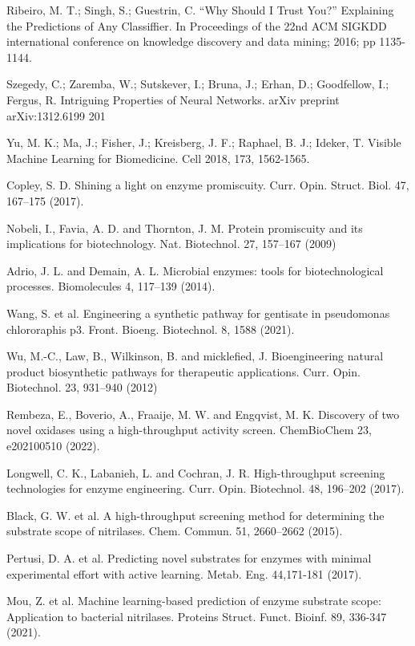 \documentclass[12pt]{article}
\begin{document}
\begin{thebibliography}{20}
 Ribeiro, M. T.; Singh, S.; Guestrin, C. “Why Should I Trust You?” Explaining the Predictions of Any Classiffier. In Proceedings of the 22nd ACM SIGKDD international conference on knowledge discovery and data mining; 2016; pp 1135-1144.

 Szegedy, C.; Zaremba, W.; Sutskever, I.; Bruna, J.; Erhan, D.; Goodfellow, I.; Fergus, R. Intriguing Properties of Neural Networks. arXiv preprint arXiv:1312.6199 201

 Yu, M. K.; Ma, J.; Fisher, J.; Kreisberg, J. F.; Raphael, B. J.; Ideker, T. Visible Machine Learning for Biomedicine. Cell 2018, 173, 1562-1565.


 Copley, S. D. Shining a light on enzyme promiscuity. Curr. Opin. Struct. Biol. 47, 167–175 (2017).

 Nobeli, I., Favia, A. D. and Thornton, J. M. Protein promiscuity and its implications for biotechnology. Nat. Biotechnol. 27, 157–167 (2009)

 Adrio, J. L. and Demain, A. L. Microbial enzymes: tools for biotechnological processes. Biomolecules 4, 117–139 (2014).

 Wang, S. et al. Engineering a synthetic pathway for gentisate in pseudomonas chlororaphis p3. Front. Bioeng. Biotechnol. 8, 1588 (2021).

 Wu, M.-C., Law, B., Wilkinson, B. and micklefied, J. Bioengineering natural product biosynthetic pathways for therapeutic applications. Curr. Opin. Biotechnol. 23, 931–940 (2012)


 Rembeza, E., Boverio, A., Fraaije, M. W. and Engqvist, M. K. Discovery of two novel oxidases using a high-throughput activity screen. ChemBioChem 23, e202100510 (2022).

 Longwell, C. K., Labanieh, L. and Cochran, J. R. High-throughput screening technologies for enzyme engineering. Curr. Opin. Biotechnol. 48, 196–202 (2017).

 Black, G. W. et al. A high-throughput screening method for determining the substrate scope of nitrilases. Chem. Commun. 51, 2660–2662 (2015).

 Pertusi, D. A. et al. Predicting novel substrates for enzymes with minimal experimental effort with active learning. Metab. Eng. 44,171-181 (2017).

 Mou, Z. et al. Machine learning-based prediction of enzyme substrate scope: Application to bacterial nitrilases. Proteins Struct. Funct. Bioinf. 89, 336-347 (2021).


\end{thebibliography}
\end{document}
